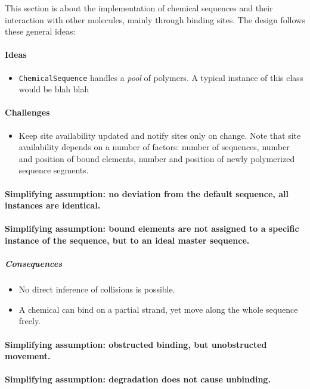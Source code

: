 This section is about the implementation of chemical sequences and their interaction with other molecules, mainly through binding sites. The design follows these general ideas:

\paragraph{Ideas}
\begin{itemize}
	\item \texttt{ChemicalSequence} handles a \emph{pool} of polymers. A typical instance of this class would be blah blah
\end{itemize}

\paragraph{Challenges}
\begin{itemize}
	\item Keep site availability updated and notify sites only on change. Note that site availability depends on a number of factors: number of sequences, number and position of bound elements, number and position of newly polymerized sequence segments.
\end{itemize}

\paragraph{Simplifying assumption: no deviation from the default sequence, all instances are identical.}

\paragraph{Simplifying assumption: bound elements are not assigned to a specific instance of the sequence, but to an ideal master sequence.}
\subparagraph{Consequences}
\begin{itemize}
	\item No direct inference of collisions is possible.
	\item A chemical can bind on a partial strand, yet move along the whole sequence freely.
\end{itemize}

\paragraph{Simplifying assumption: obstructed binding, but unobstructed movement.}

\paragraph{Simplifying assumption: degradation does not cause unbinding.}